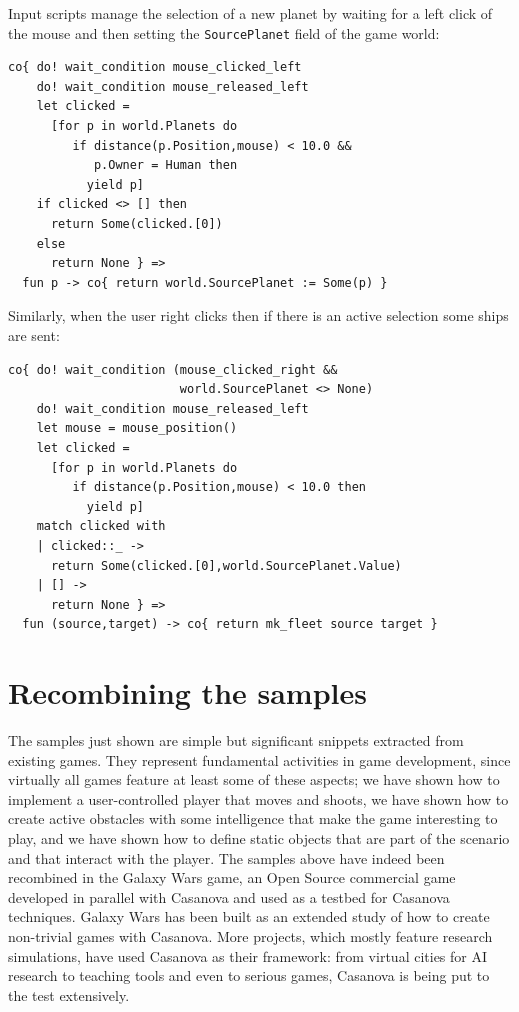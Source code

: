 Input scripts manage the selection of a new planet by waiting for a left click of the mouse and then setting the \texttt{SourcePlanet} field of the game world:

\begin{lstlisting}
co{ do! wait_condition mouse_clicked_left
    do! wait_condition mouse_released_left
    let clicked = 
      [for p in world.Planets do 
         if distance(p.Position,mouse) < 10.0 && 
            p.Owner = Human then 
           yield p] 
    if clicked <> [] then
      return Some(clicked.[0])
    else 
      return None } =>
  fun p -> co{ return world.SourcePlanet := Some(p) }
\end{lstlisting}

Similarly, when the user right clicks then if there is an active selection some ships are sent:

\begin{lstlisting}
co{ do! wait_condition (mouse_clicked_right && 
                        world.SourcePlanet <> None)
    do! wait_condition mouse_released_left
    let mouse = mouse_position() 
    let clicked = 
      [for p in world.Planets do
         if distance(p.Position,mouse) < 10.0 then
           yield p] 
    match clicked with
    | clicked::_ ->
      return Some(clicked.[0],world.SourcePlanet.Value) 
    | [] ->
      return None } => 
  fun (source,target) -> co{ return mk_fleet source target } 
\end{lstlisting}


\section{Recombining the samples}
The samples just shown are simple but significant snippets extracted from existing games. They represent fundamental activities in game development, since virtually all games feature at least some of these aspects; we have shown how to implement a user-controlled player that moves and shoots, we have shown how to create active obstacles with some intelligence that make the game interesting to play, and we have shown how to define static objects that are part of the scenario and that interact with the player. The samples above have indeed been recombined in the Galaxy Wars \cite{GALAXY_WARS} game, an Open Source commercial game developed in parallel with Casanova and used as a testbed for Casanova techniques. Galaxy Wars has been built as an extended study of how to create non-trivial games with Casanova. More projects, which mostly feature research simulations, have used Casanova as their framework: from virtual cities for AI research to teaching tools and even to serious games, Casanova is being put to the test extensively.

